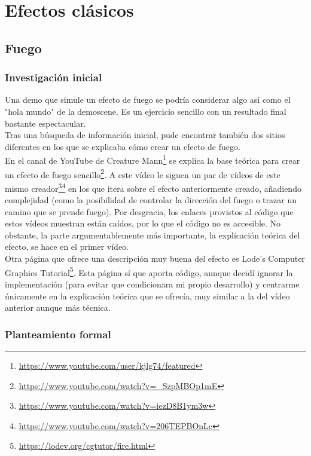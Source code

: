 \chapter{Efectos clásicos}

\section{Fuego} \label{sec:fire}

\subsection{Investigación inicial}

Una demo que simule un efecto de fuego se podría considerar algo así como el "hola mundo" de la demoscene. Es un ejercicio sencillo con un resultado final bastante espectacular.\\

Tras una búsqueda de información inicial, pude encontrar también dos sitios diferentes en los que se explicaba cómo crear un efecto de fuego.\\ 

En el canal de YouTube de Creature Mann\footnote{\url{https://www.youtube.com/user/kjlg74/featured}} se explica la base teórica para crear un efecto de fuego sencillo\footnote{\url{https://www.youtube.com/watch?v=_SzpMBOp1mE}}. A este vídeo le siguen un par de vídeos de este mismo creador\footnote{\url{https://www.youtube.com/watch?v=iezD8B1ym3w}}\footnote{\url{https://www.youtube.com/watch?v=206TEPBOnLc}} en los que itera sobre el efecto anteriormente creado, añadiendo complejidad (como la posibilidad de controlar la dirección del fuego o trazar un camino que se prende fuego). Por desgracia, los enlaces provistos al código que estos vídeos muestran están caídos, por lo que el código no es accesible. No obstante, la parte argumentablemente más importante, la explicación teórica del efecto, se hace en el primer vídeo.\\

Otra página que ofrece una descripción muy buena del efecto es Lode's Computer Graphics Tutorial\footnote{\url{https://lodev.org/cgtutor/fire.html}}. Esta página sí que aporta código, aunque decidí ignorar la implementación (para evitar que condicionara mi propio desarrollo) y centrarme únicamente en la explicación teórica que se ofrecía, muy similar a la del vídeo anterior aunque más técnica.\\

\subsection{Planteamiento formal}

